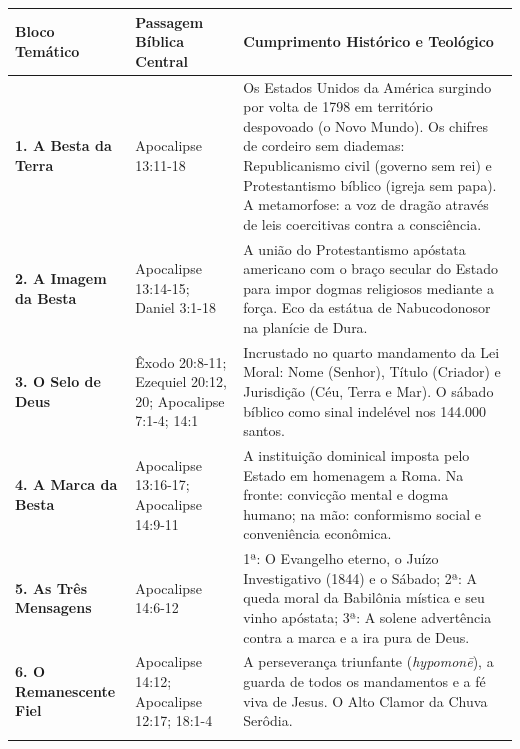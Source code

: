 \begin{table}[htbp]
\centering
\footnotesize
\setlength{\tabcolsep}{5pt}
\renewcommand{\arraystretch}{1.25}
\begin{tabularx}{\textwidth}{>{\raggedright\arraybackslash}p{} >{\raggedright\arraybackslash}X >{\raggedright\arraybackslash}X}
\toprule
\textbf{Bloco Temático} & \textbf{Passagem Bíblica Central} & \textbf{Cumprimento Histórico e Teológico} \\
\midrule
\textbf{1. A Besta da Terra} & Apocalipse 13:11-18 & Os Estados Unidos da América surgindo por volta de 1798 em território despovoado (o Novo Mundo). Os chifres de cordeiro sem diademas: Republicanismo civil (governo sem rei) e Protestantismo bíblico (igreja sem papa). A metamorfose: a voz de dragão através de leis coercitivas contra a consciência. \\
\addlinespace[3pt]
\textbf{2. A Imagem da Besta} & Apocalipse 13:14-15; Daniel 3:1-18 & A união do Protestantismo apóstata americano com o braço secular do Estado para impor dogmas religiosos mediante a força. Eco da estátua de Nabucodonosor na planície de Dura. \\
\addlinespace[3pt]
\textbf{3. O Selo de Deus} & Êxodo 20:8-11; Ezequiel 20:12, 20; Apocalipse 7:1-4; 14:1 & Incrustado no quarto mandamento da Lei Moral: Nome (Senhor), Título (Criador) e Jurisdição (Céu, Terra e Mar). O sábado bíblico como sinal indelével nos 144.000 santos. \\
\addlinespace[3pt]
\textbf{4. A Marca da Besta} & Apocalipse 13:16-17; Apocalipse 14:9-11 & A instituição dominical imposta pelo Estado em homenagem a Roma. Na fronte: convicção mental e dogma humano; na mão: conformismo social e conveniência econômica. \\
\addlinespace[3pt]
\textbf{5. As Três Mensagens} & Apocalipse 14:6-12 & 1ª: O Evangelho eterno, o Juízo Investigativo (1844) e o Sábado; 2ª: A queda moral da Babilônia mística e seu vinho apóstata; 3ª: A solene advertência contra a marca e a ira pura de Deus. \\
\addlinespace[3pt]
\textbf{6. O Remanescente Fiel} & Apocalipse 14:12; Apocalipse 12:17; 18:1-4 & A perseverança triunfante (\textit{hypomonē}), a guarda de todos os mandamentos e a fé viva de Jesus. O Alto Clamor da Chuva Serôdia. \\
\addlinespace[3pt]
\bottomrule
\end{tabularx}
\end{table}
